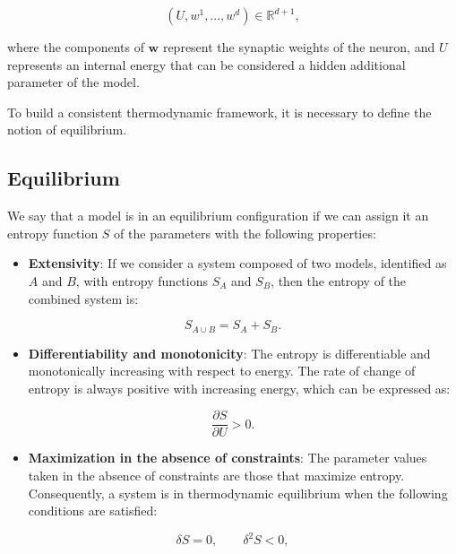 \documentclass[12pt]{article}
\begin{document}
\begin{equation}
(U, w^1, ..., w^d) \in \mathbb{R}^{d+1},
\end{equation}

where the components of $\mathbf{w}$ represent the synaptic weights of the neuron, and $U$ represents an internal energy that can be considered a hidden additional parameter of the model.

To build a consistent thermodynamic framework, it is necessary to define the notion of equilibrium.
\subsection*{Equilibrium}

We say that a model is in an equilibrium configuration if we can assign it an entropy function $S$ of the parameters with the following properties:

\begin{itemize}
  \item \textbf{Extensivity}: If we consider a system composed of two models, identified as $A$ and $B$, with entropy functions $S_A$ and $S_B$, then the entropy of the combined system is:
\end{itemize}
\begin{equation}
S_{A \cup B} = S_A + S_B.
\end{equation}

\begin{itemize}
  \item \textbf{Differentiability and monotonicity}: The entropy is differentiable and monotonically increasing with respect to energy. The rate of change of entropy is always positive with increasing energy, which can be expressed as:
\end{itemize}
\begin{equation}
\frac{\partial S}{\partial U} > 0.
\end{equation}

\begin{itemize}
  \item \textbf{Maximization in the absence of constraints}: The parameter values taken in the absence of constraints are those that maximize entropy. Consequently, a system is in thermodynamic equilibrium when the following conditions are satisfied:
\end{itemize}
\begin{equation}
\delta S = 0, \qquad \delta^2 S < 0,
\end{equation}
\end{document}
